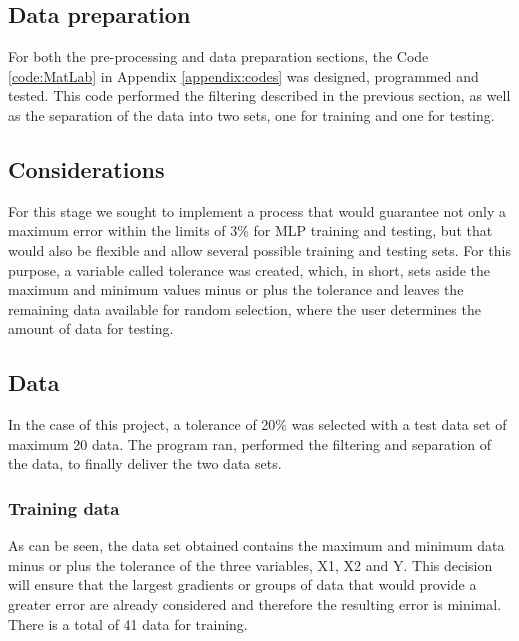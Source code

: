 \documentclass{article}
\begin{document}
\begin{doublespacing}
\newpage
\section{Data preparation}

\par For both the pre-processing and data preparation sections, the Code \ref{code:MatLab} in Appendix \ref{appendix:codes} was designed, programmed and tested. This code performed the filtering described in the previous section, as well as the separation of the data into two sets, one for training and one for testing. 

\subsection{Considerations}

\par For this stage we sought to implement a process that would guarantee not only a maximum error within the limits of 3\% for MLP training and testing, but that would also be flexible and allow several possible training and testing sets. For this purpose, a variable called tolerance was created, which, in short, sets aside the maximum and minimum values minus or plus the tolerance and leaves the remaining data available for random selection, where the user determines the amount of data for testing. 

\subsection{Data}

\par In the case of this project, a tolerance of 20\% was selected with a test data set of maximum 20 data. The program ran, performed the filtering and separation of the data, to finally deliver the two data sets.

\subsubsection{Training data}

\par As can be seen, the data set obtained contains the maximum and minimum data minus or plus the tolerance of the three variables, X1, X2 and Y. This decision will ensure that the largest gradients or groups of data that would provide a greater error are already considered and therefore the resulting error is minimal. There is a total of 41 data for training.


\end{doublespacing}
\end{document}
